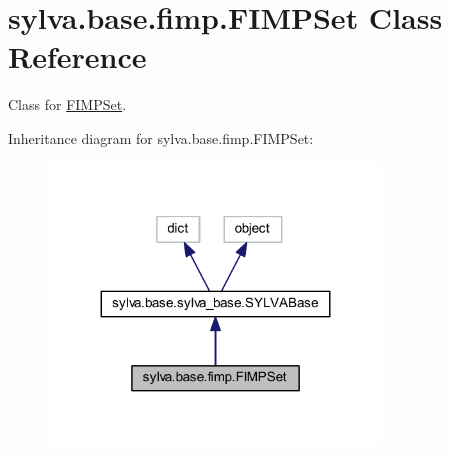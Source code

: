 \hypertarget{classsylva_1_1base_1_1fimp_1_1_f_i_m_p_set}{}\section{sylva.\+base.\+fimp.\+F\+I\+M\+P\+Set Class Reference}
\label{classsylva_1_1base_1_1fimp_1_1_f_i_m_p_set}


Class for \hyperlink{classsylva_1_1base_1_1fimp_1_1_f_i_m_p_set}{F\+I\+M\+P\+Set}.  




Inheritance diagram for sylva.\+base.\+fimp.\+F\+I\+M\+P\+Set\+:\nopagebreak
\begin{figure}[H]
\begin{center}
\leavevmode
\includegraphics[width=251pt]{classsylva_1_1base_1_1fimp_1_1_f_i_m_p_set__inherit__graph}
\end{center}
\end{figure}

